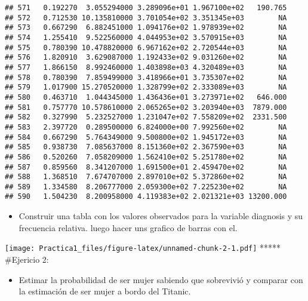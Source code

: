\documentclass[
]{article}
\newenvironment{Shaded}{\begin{snugshade}}{\end{snugshade}}
\newcommand{\FunctionTok}[1]{\textcolor[rgb]{0.00,0.00,0.00}{#1}}
\newcommand{\NormalTok}[1]{#1}
\newcommand{\OtherTok}[1]{\textcolor[rgb]{0.56,0.35,0.01}{#1}}
\newcommand{\SpecialCharTok}[1]{\textcolor[rgb]{0.00,0.00,0.00}{#1}}
\providecommand{\tightlist}{%
  \setlength{\itemsep}{0pt}\setlength{\parskip}{0pt}}
\begin{document}
\begin{verbatim}
## 571   0.192270  3.055294000 3.289096e+01 1.967100e+02   190.765
## 572   0.712530 10.135810000 3.701054e+02 3.351345e+03        NA
## 573   0.667290  6.882451000 1.094176e+02 1.978939e+02        NA
## 574   1.255410  9.522560000 4.044953e+02 3.570915e+03        NA
## 575   0.780390 10.478820000 6.967162e+02 2.720544e+03        NA
## 576   1.820910  3.629087000 1.192433e+02 9.031260e+02        NA
## 577   1.866150  8.992460000 1.403898e+03 4.320489e+03        NA
## 578   0.780390  7.859499000 3.418966e+01 3.735307e+02        NA
## 579   1.017900 15.270520000 1.328799e+02 2.333089e+03        NA
## 580   0.463710  1.044345000 1.436436e+01 3.273971e+02   646.000
## 581   0.757770 10.578610000 2.065265e+02 3.203940e+03  7879.000
## 582   0.327990  5.232527000 1.231047e+02 7.558209e+02  2331.500
## 583   2.397720  0.289500000 6.824000e+00 7.992560e+02        NA
## 584   0.667290  5.764349000 9.500800e+02 1.945172e+03        NA
## 585   0.938730  7.085637000 8.151360e+02 2.367590e+03        NA
## 586   0.520260  7.058209000 1.562410e+02 5.251780e+02        NA
## 587   0.859560  8.341207000 1.691500e+01 2.459470e+02        NA
## 588   1.368510  7.674707000 2.897010e+02 5.372860e+02        NA
## 589   1.334580  8.206777000 2.059300e+02 7.225230e+02        NA
## 590   1.504230  8.200958000 4.119383e+02 2.021321e+03 13200.000
\end{verbatim}

\begin{itemize}
\tightlist
\item
  Construir una tabla con los valores observados para la variable
  diagnosis y su frecuencia relativa. luego hacer uns grafico de barras
  con el.
\end{itemize}

\begin{Shaded}
\end{Shaded}

\texttt{[image: Practica1\_files/figure-latex/unnamed-chunk-2-1.pdf]}
***** \#Ejericio 2:

\begin{itemize}
\tightlist
\item
  Estimar la probabilidad de ser mujer sabiendo que sobrevivió y
  comparar con la estimación de ser mujer a bordo del Titanic.
\end{itemize}
\end{document}
